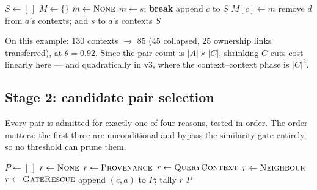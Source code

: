 \documentclass[11pt]{article}
\begin{document}
\begin{algorithm}[H]
\caption{\textsc{DedupNearDuplicates}$(C, A, \theta)$}
\begin{algorithmic}[1]
\State $S \gets [\,]$ 
\State $M \gets \{\}$ 
  \State $m \gets \textsc{None}$
      \State $m \gets s$; \textbf{break}
    \EndIf
  \EndFor
   \State append $c$ to $S$
  \Else{} \State $M[c] \gets m$
  \EndIf
\EndFor
{} 
    \State remove $d$ from $a$'s contexts; add $s$ to $a$'s contexts
  \EndFor
\EndFor
\State \Return $S$ 
\end{algorithmic}
\end{algorithm}

On this example: 130 contexts $\to$ 85 (45 collapsed, 25 ownership links transferred), at $\theta = 0.92$. Since the pair count is $|A| \times |C|$, shrinking $C$ cuts cost linearly here --- and quadratically in v3, where the context--context phase is $|C|^2$.

\subsection{Stage 2: candidate pair selection}
Every pair is admitted for exactly one of four reasons, tested in order. The order matters: the first three are unconditional and bypass the similarity gate entirely, so no threshold can prune them.

\begin{algorithm}[H]
\caption{\textsc{SelectAtomContextPairs}$(A, C, \text{policy}, \tau, w)$}
\begin{algorithmic}[1]
\State $P \gets [\,]$
 
    \State $r \gets \textsc{None}$
      \State $r \gets \textsc{Provenance}$ 
      \State $r \gets \textsc{QueryContext}$ 
      \State $r \gets \textsc{Neighbour}$ 
      \State $r \gets \textsc{GateRescue}$ 
    \EndIf
     \State append $(c, a)$ to $P$; tally $r$
    \EndIf
  \EndFor
\EndFor
\State \Return $P$
\end{algorithmic}
\end{algorithm}
\end{document}
